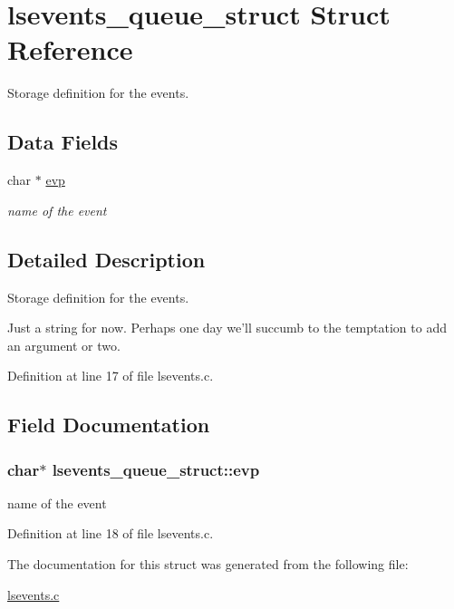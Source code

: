 \hypertarget{structlsevents__queue__struct}{\section{lsevents\-\_\-queue\-\_\-struct Struct Reference}
\label{structlsevents__queue__struct}
}


Storage definition for the events.  


\subsection*{Data Fields}
\begin{DoxyCompactItemize}
\item 
char $\ast$ \hyperlink{structlsevents__queue__struct_a3ac2148f21e4a23ce6df588374749bda}{evp}
\begin{DoxyCompactList}\small\item\em name of the event \end{DoxyCompactList}\end{DoxyCompactItemize}


\subsection{Detailed Description}
Storage definition for the events. 

Just a string for now. Perhaps one day we'll succumb to the temptation to add an argument or two. 

Definition at line 17 of file lsevents.\-c.



\subsection{Field Documentation}
\hypertarget{structlsevents__queue__struct_a3ac2148f21e4a23ce6df588374749bda}{
\subsubsection[{evp}]{\setlength{\rightskip}{0pt plus 5cm}char$\ast$ lsevents\-\_\-queue\-\_\-struct\-::evp}}\label{structlsevents__queue__struct_a3ac2148f21e4a23ce6df588374749bda}


name of the event 



Definition at line 18 of file lsevents.\-c.



The documentation for this struct was generated from the following file\-:\begin{DoxyCompactItemize}
\item 
\hyperlink{lsevents_8c}{lsevents.\-c}\end{DoxyCompactItemize}
